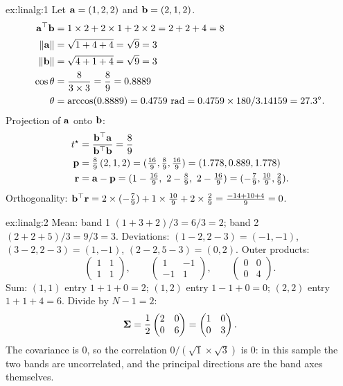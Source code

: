 
\begin{solution}{ex:linalg:1}
Let $\mathbf{a} = (1, 2, 2)$ and $\mathbf{b} = (2, 1, 2)$.
\begin{align*}
\mathbf{a}^{\top}\mathbf{b} &= 1\times2 + 2\times1 + 2\times2 = 2 + 2 + 4 = 8\\
\left\lVert \mathbf{a} \right\rVert &= \sqrt{1 + 4 + 4} = \sqrt9 = 3\\
\left\lVert \mathbf{b} \right\rVert &= \sqrt{4 + 1 + 4} = \sqrt9 = 3\\
\cos\theta &= \frac{8}{3\times3} = \frac89 = 0.8889\\
\theta &= \arccos(0.8889) = 0.4759\ \text{rad} = 0.4759\times180/3.14159 = 27.3^\circ .
\end{align*}
Projection of $\mathbf{a}$ onto $\mathbf{b}$:
\begin{align*}
t^\star &= \frac{\mathbf{b}^{\top}\mathbf{a}}{\mathbf{b}^{\top}\mathbf{b}} = \frac{8}{9}\\
\mathbf{p} &= \tfrac89\,(2, 1, 2) = (\tfrac{16}{9}, \tfrac89, \tfrac{16}{9}) = (1.778, 0.889, 1.778)\\
\mathbf{r} &= \mathbf{a} - \mathbf{p} = (1 - \tfrac{16}{9},\ 2 - \tfrac89,\ 2 - \tfrac{16}{9})
  = (-\tfrac79, \tfrac{10}{9}, \tfrac29).
\end{align*}
Orthogonality: $\mathbf{b}^{\top}\mathbf{r} = 2\times(-\tfrac79) + 1\times\tfrac{10}{9} + 2\times\tfrac29
= \tfrac{-14 + 10 + 4}{9} = 0$.
\end{solution}

\begin{solution}{ex:linalg:2}
Mean: band 1 $(1 + 3 + 2)/3 = 6/3 = 2$; band 2 $(2 + 2 + 5)/3 = 9/3 = 3$.
Deviations: $(1-2, 2-3) = (-1, -1)$, $(3-2, 2-3) = (1, -1)$, $(2-2, 5-3) = (0, 2)$.
Outer products:
\[
\begin{pmatrix} 1 & 1\\ 1 & 1\end{pmatrix},\qquad
\begin{pmatrix} 1 & -1\\ -1 & 1\end{pmatrix},\qquad
\begin{pmatrix} 0 & 0\\ 0 & 4\end{pmatrix}.
\]
Sum: $(1,1)$ entry $1 + 1 + 0 = 2$; $(1,2)$ entry $1 - 1 + 0 = 0$; $(2,2)$ entry $1 + 1 + 4 = 6$.
Divide by $N - 1 = 2$:
\[
\boldsymbol{\Sigma} = \frac12\begin{pmatrix} 2 & 0\\ 0 & 6\end{pmatrix} = \begin{pmatrix} 1 & 0\\ 0 & 3\end{pmatrix}.
\]
The covariance is 0, so the correlation $0/(\sqrt1\times\sqrt3)$ is 0: in this sample the two
bands are uncorrelated, and the principal directions are the band axes themselves.
\end{solution}

